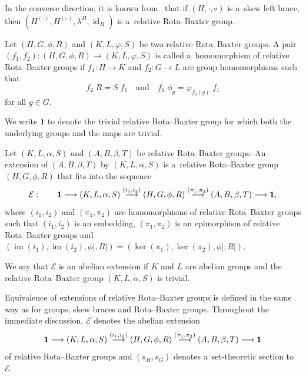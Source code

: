 \documentclass{jonasart}
\theoremstyle{plain}
\DeclareMathOperator{\Id}{id}
\DeclareMathOperator{\im}{im}
\DeclareMathOperator{\Ker}{ker}
\begin{document}
	In the converse direction, it is known from~\cite[Theorem 3.10]{MR4857550} that if $(H,\cdot,\circ)$ is a~skew left brace, then $(H^{(\cdot)}, H^{(\circ)}, \lambda^H, \Id_H)$ is a~relative Rota--Baxter group.
	
	\begin{definition}
		Let $(H, G, \phi, R)$ and $(K, L, \varphi, S)$ be two relative Rota--Baxter groups. A pair $(f_1, f_2 ): (H, G, \phi, R) \to (K, L, \varphi, S)$ is called a~homomorphism of relative Rota--Baxter groups if $f_1: H \rightarrow K$ and $f_2: G \rightarrow L$ are group homomorphisms such that
		\begin{equation}
			f_2 \; R = S \; f_1 \quad \textrm{and} \quad f_1 \; \phi_g = \varphi_{f_2 (g)}\; f_1
		\end{equation}
		for all $g \in G$.
	\end{definition}
	
	We write $\textbf{1}$ to denote the trivial relative Rota--Baxter group for which both the underlying groups and the maps are trivial.
	
	\begin{definition}
		Let $(K,L, \alpha,S )$ and $(A,B, \beta, T)$ be relative Rota--Baxter groups. An extension of $(A,B, \beta, T)$ by $(K,L, \alpha,S )$ is a~relative Rota--Baxter group $(H,G, \phi, R)$ that fits into the sequence
		\[
		\mathcal{E} : \quad \quad  {\bf 1} \longrightarrow (K,L, \alpha,S ) \stackrel{(i_1, i_2)}{\longrightarrow}  (H,G, \phi, R) \stackrel{(\pi_1, \pi_2)}{\longrightarrow} (A,B, \beta, T) \longrightarrow {\bf 1},
		\]
		where $(i_1, i_2 )$ and $(\pi_1, \pi_2 )$ are homomorphisms of relative Rota--Baxter groups such that $(i_1, i_2 )$ is an embedding, $(\pi_1, \pi_2 )$ is an epimorphism of relative Rota--Baxter groups and $(\im(i_1 ), \im(i_2 ), \phi|, R|)= (\Ker(\pi_1 ), \Ker(\pi_2 ), \phi|, R|)$.
		
		We say that $\mathcal{E}$ is an abelian extension if $K$ and $L$ are abelian groups and the relative Rota--Baxter group $(K,L, \alpha,S )$ is trivial.
	\end{definition}
	
	Equivalence of extensions of relative Rota--Baxter groups is defined in the same way as for groups, skew braces and Rota--Baxter groups. Throughout the immediate discussion, $\mathcal{E}$ denotes the abelian extension
	\[
	{\bf 1} \longrightarrow (K,L, \alpha,S ) \stackrel{(i_1, i_2)}{\longrightarrow}  (H,G, \phi, R) \stackrel{(\pi_1, \pi_2)}{\longrightarrow} (A,B, \beta, T) \longrightarrow {\bf 1}
	\]
	of relative Rota--Baxter groups and $(s_H, s_G )$ denotes a~set-theoretic section to $\mathcal{E}$.
	
\end{document}
